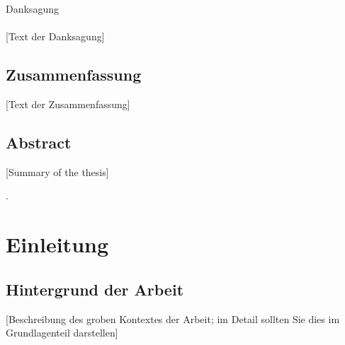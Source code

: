\documentclass[oneside,bibliography=totocnumbered,BCOR=5mm]{scrbook}
\begin{document}
\thispagestyle{empty}
\vspace*{2.2cm}
\noindent
{\Huge Danksagung}\\
\vspace*{1.6cm} \\


[Text der Danksagung]

\newpage
\thispagestyle{empty}
\section*{Zusammenfassung}
[Text der Zusammenfassung]

\section*{Abstract}
[Summary of the thesis]


\clearpage

\tableofcontents
.
\newpage



\chapter{Einleitung}
\label{sec:einleitung}

\section{Hintergrund der Arbeit}
[Beschreibung des groben Kontextes der Arbeit; im Detail sollten Sie dies im Grundlagenteil darstellen]

\end{document}
